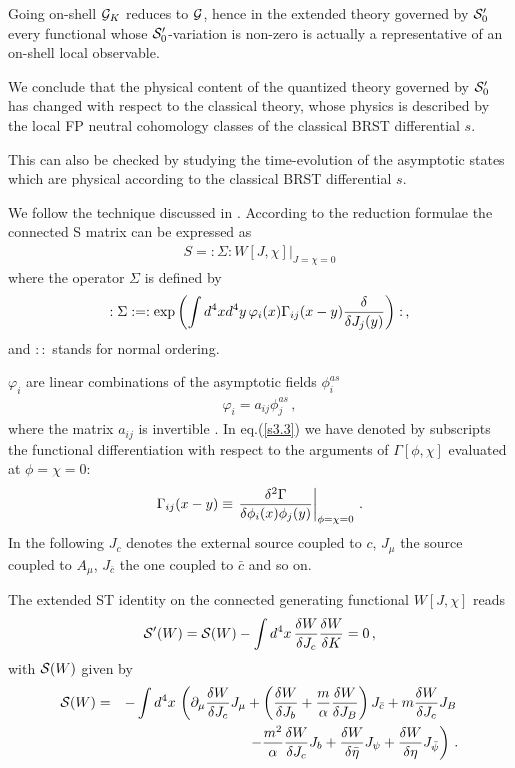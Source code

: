 \documentclass[a4paper,11pt]{article}
\def\G{\Gamma}
\begin{document}
 Going on-shell ${\cal G}_K$ reduces to 
${\cal G}$, hence in the extended theory governed by ${\cal S}'_0$
every functional whose ${\cal S}'_0$-variation is non-zero
is actually a representative of an on-shell local observable.
%

We conclude that the physical content of the quantized theory governed 
by ${\cal S}'_0$ has changed with respect to the classical
theory, whose physics is described by the local FP neutral cohomology classes of the
classical BRST differential $s$.

This can also be checked by studying the time-evolution of the asymptotic states
which are physical according to the classical BRST differential  $s$.


We follow the technique discussed in \cite{becchi}. 
According
to the reduction formulae the connected S matrix can be expressed as
%
\begin{eqnarray}
S = : \left . \Sigma : W[J,\chi] \right |_{J=\chi=0}
\label{s3.2}
\end{eqnarray}
%
where the operator $\Sigma$ is defined by
%
\begin{eqnarray}
:\Sigma: = : \exp  
\left ( 
\int d^4x d^4y \, \varphi_i(x) \G_{ij}(x-y) {\delta \over \delta J_j(y)}  
\right ) : \, ,
\label{s3.3}
\end{eqnarray}
%
and $::$ stands for normal ordering.

$\varphi_i$ are linear combinations of the asymptotic fields 
$\phi^{as}_i$
%
\begin{eqnarray}
\varphi_i = a_{ij} \phi^{as}_j \, ,
\label{s3.3bis}
\end{eqnarray}
%
where the matrix $a_{ij}$ is invertible \cite{becchi}.
In eq.(\ref{s3.3}) we have denoted by subscripts 
the functional differentiation with respect to the arguments of
$\G[\phi,\chi]$ evaluated at $\phi=\chi=0$:
%
\begin{eqnarray}
\G_{ij}(x-y) \equiv
\left . {\delta^2 \G \over \delta \phi_i(x) \phi_j(y)} \right |_{\phi=\chi=0}
\, . 
\label{s3.4}
\end{eqnarray}
%
In the following
$J_c$ denotes the external source 
coupled to $c$, $J_\mu$ the source coupled to $A_\mu$, $J_{\bar c}$ the one
coupled to $\bar c$ and so on.


The extended ST identity on the connected generating functional $W[J,\chi]$
reads
%
\begin{eqnarray}
{\cal S}'(W) = {\cal S}(W) - \int d^4x \, {\delta W \over \delta J_c}
{\delta W \over \delta K} = 0 \, ,
\label{s3.5}
\end{eqnarray}
%
with ${\cal S}(W)$ given by
%
\begin{eqnarray}
{\cal S}(W) & = & - \int d^4x \, 
\left ( \partial_\mu {\delta W \over \delta J_c} J_\mu 
+ \left ( {\delta W \over \delta J_b} + 
{m \over \alpha} {\delta W \over \delta J_B} \right ) J_{\bar c}
+ m {\delta W \over \delta J_c} J_B \right . \nonumber \\
& & ~~~~~~~~ \left . 
- {m^2 \over \alpha} {\delta W \over \delta J_c} J_b
+ {\delta W \over \delta \bar \eta} J_{\psi} 
+ {\delta W \over \delta \eta} J_{\bar \psi} 
\right ) \, .
\label{s3.6}
\end{eqnarray}
%
\end{document}
